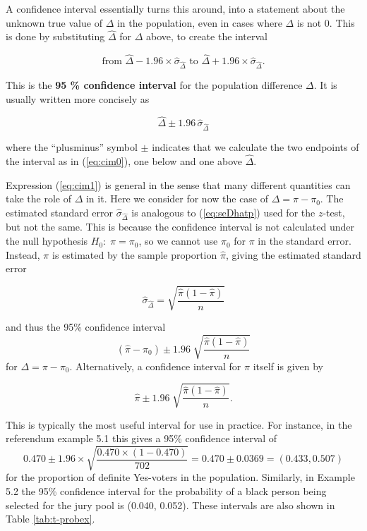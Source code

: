 \documentclass[11pt,a4paper,openany]{book}
\begin{document}
A confidence interval essentially turns this around, into a statement
about the unknown true value of \(\Delta\) in the population, even in
cases where \(\Delta\) is not 0. This is done by substituting
\(\hat{\Delta}\) for \(\Delta\) above, to create the interval

\begin{equation}\text{from  }
\hat{\Delta} -1.96\times \hat{\sigma}_{\hat{\Delta}}
\text{  to  }
\hat{\Delta}
+1.96\times \hat{\sigma}_{\hat{\Delta}}.
\label{eq:cim0}\end{equation}

This is the \textbf{95 \% confidence interval} for the population
difference \(\Delta\). It is usually written more concisely as

\begin{equation}\hat{\Delta}
\pm 1.96\, \hat{\sigma}_{\hat{\Delta}}
\label{eq:cim1}\end{equation}

where the ``plusminus'' symbol \(\pm\) indicates that we calculate the
two endpoints of the interval as in (\ref{eq:cim0}), one below and one
above \(\hat{\Delta}\).

Expression (\ref{eq:cim1}) is general in the sense that many different
quantities can take the role of \(\Delta\) in it. Here we consider for
now the case of \(\Delta=\pi-\pi_{0}\). The estimated standard error
\(\hat{\sigma}_{\hat{\Delta}}\) is analogous to (\ref{eq:seDhatp}) used
for the \(z\)-test, but not the same. This is because the confidence
interval is not calculated under the null hypothesis
\(H_{0}:\; \pi=\pi_{0}\), so we cannot use \(\pi_{0}\) for \(\pi\) in
the standard error. Instead, \(\pi\) is estimated by the sample
proportion \(\hat{\pi}\), giving the estimated standard error

\begin{equation}\hat{\sigma}_{\hat{\Delta}} = \sqrt{
\frac{\hat{\pi}(1-\hat{\pi})}{n}
}
\label{eq:sephat2}\end{equation}

and thus the 95\% confidence interval \[(\hat{\pi}-\pi_{0}) \pm 1.96 \;
\sqrt{
\frac{\hat{\pi}(1-\hat{\pi})}{n}}\] for \(\Delta=\pi-\pi_{0}\).
Alternatively, a confidence interval for \(\pi\) itself is given by

\begin{equation}\hat{\pi} \pm 1.96 \;
\sqrt{
\frac{\hat{\pi}(1-\hat{\pi})}{n}}.
\label{eq:cip2}\end{equation}

This is typically the most useful interval for use in practice. For
instance, in the referendum example 5.1 this gives a 95\% confidence
interval of
\[0.470\pm 1.96\times \sqrt{\frac{0.470\times(1-0.470)}{702}}
=0.470\pm 0.0369=(0.433, 0.507)\] for the proportion of definite
Yes-voters in the population. Similarly, in Example 5.2 the 95\%
confidence interval for the probability of a black person being selected
for the jury pool is (0.040, 0.052). These intervals are also shown in
Table \ref{tab:t-probex}.
\end{document}
